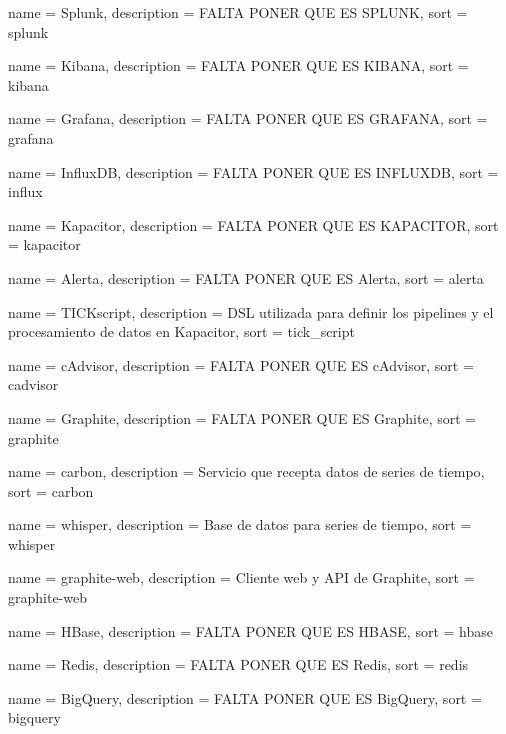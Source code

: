  {
  name        = {Splunk},
  description = {FALTA PONER QUE ES SPLUNK},
  sort        = {splunk}
}

 {
  name        = {Kibana},
  description = {FALTA PONER QUE ES KIBANA},
  sort        = {kibana}
}

 {
  name        = {Grafana},
  description = {FALTA PONER QUE ES GRAFANA},
  sort        = {grafana}
}

 {
  name        = {InfluxDB},
  description = {FALTA PONER QUE ES INFLUXDB},
  sort        = {influx}
}

 {
  name        = {Kapacitor},
  description = {FALTA PONER QUE ES KAPACITOR},
  sort        = {kapacitor}
}

 {
  name        = {Alerta},
  description = {FALTA PONER QUE ES Alerta},
  sort        = {alerta}
}

 {
  name        = {TICKscript},
  description =
    {DSL utilizada para definir los pipelines y el procesamiento de datos en
    Kapacitor},
  sort        = {tick_script}
}

 {
  name        = {cAdvisor},
  description = {FALTA PONER QUE ES cAdvisor},
  sort        = {cadvisor}
}

 {
  name        = {Graphite},
  description = {FALTA PONER QUE ES Graphite},
  sort        = {graphite}
}

 {
  name        = {carbon},
  description = {Servicio que recepta datos de series de tiempo},
  sort        = {carbon}
}

 {
  name        = {whisper},
  description = {Base de datos para series de tiempo},
  sort        = {whisper}
}

 {
  name        = {graphite-web},
  description = {Cliente web y API de Graphite},
  sort        = {graphite-web}
}

 {
  name        = {HBase},
  description = {FALTA PONER QUE ES HBASE},
  sort        = {hbase}
}

 {
  name        = {Redis},
  description = {FALTA PONER QUE ES Redis},
  sort        = {redis}
}

 {
  name        = {BigQuery},
  description = {FALTA PONER QUE ES BigQuery},
  sort        = {bigquery}
}

